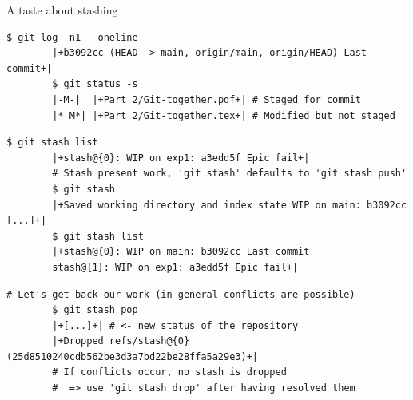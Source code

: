 \documentclass[usenames,svgnames,14pt]{beamer}
\begin{document}
\begin{frame}[fragile]{A taste about stashing}
    \begin{lstlisting}[style=MyBash, xleftmargin=-2mm, xrightmargin=-2mm]
        $ git log -n1 --oneline
        |+b3092cc (HEAD -> main, origin/main, origin/HEAD) Last commit+|
        $ git status -s
        |-M-|  |+Part_2/Git-together.pdf+| # Staged for commit
        |* M*| |+Part_2/Git-together.tex+| # Modified but not staged
    \end{lstlisting}
    \begin{lstlisting}[style=MyBash, xleftmargin=-2mm, xrightmargin=-2mm]
        $ git stash list
        |+stash@{0}: WIP on exp1: a3edd5f Epic fail+|
        # Stash present work, 'git stash' defaults to 'git stash push'
        $ git stash
        |+Saved working directory and index state WIP on main: b3092cc [...]+|
        $ git stash list
        |+stash@{0}: WIP on main: b3092cc Last commit
        stash@{1}: WIP on exp1: a3edd5f Epic fail+|
    \end{lstlisting}
    \begin{lstlisting}[style=MyBash, xleftmargin=-2mm, xrightmargin=-2mm]
        # Let's get back our work (in general conflicts are possible)
        $ git stash pop
        |+[...]+| # <- new status of the repository
        |+Dropped refs/stash@{0} (25d8510240cdb562be3d3a7bd22be28ffa5a29e3)+|
        # If conflicts occur, no stash is dropped
        #  => use 'git stash drop' after having resolved them
    \end{lstlisting}
\end{frame}


\end{document}
